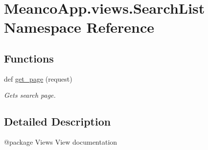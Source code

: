 \hypertarget{namespace_meanco_app_1_1views_1_1_search_list}{}\section{Meanco\+App.\+views.\+Search\+List Namespace Reference}
\label{namespace_meanco_app_1_1views_1_1_search_list}
\subsection*{Functions}
\begin{DoxyCompactItemize}
\item 
\hypertarget{namespace_meanco_app_1_1views_1_1_search_list_a715e6f7e45d2558d40c7929295cf5c0c}{}\label{namespace_meanco_app_1_1views_1_1_search_list_a715e6f7e45d2558d40c7929295cf5c0c} 
def \hyperlink{namespace_meanco_app_1_1views_1_1_search_list_a715e6f7e45d2558d40c7929295cf5c0c}{get\+\_\+page} (request)
\begin{DoxyCompactList}\small\item\em Gets search page. \end{DoxyCompactList}\end{DoxyCompactItemize}


\subsection{Detailed Description}
\begin{DoxyVerb}@package Views
View documentation\end{DoxyVerb}
 